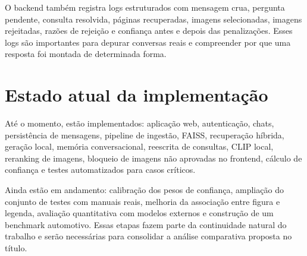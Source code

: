 O backend também registra logs estruturados com mensagem crua, pergunta pendente, consulta resolvida, páginas recuperadas, imagens selecionadas, imagens rejeitadas, razões de rejeição e confiança antes e depois das penalizações. Esses logs são importantes para depurar conversas reais e compreender por que uma resposta foi montada de determinada forma.

\section{Estado atual da implementação}

Até o momento, estão implementados: aplicação web, autenticação, chats, persistência de mensagens, pipeline de ingestão, FAISS, recuperação híbrida, geração local, memória conversacional, reescrita de consultas, CLIP local, reranking de imagens, bloqueio de imagens não aprovadas no frontend, cálculo de confiança e testes automatizados para casos críticos.

Ainda estão em andamento: calibração dos pesos de confiança, ampliação do conjunto de testes com manuais reais, melhoria da associação entre figura e legenda, avaliação quantitativa com modelos externos e construção de um benchmark automotivo. Essas etapas fazem parte da continuidade natural do trabalho e serão necessárias para consolidar a análise comparativa proposta no título.
